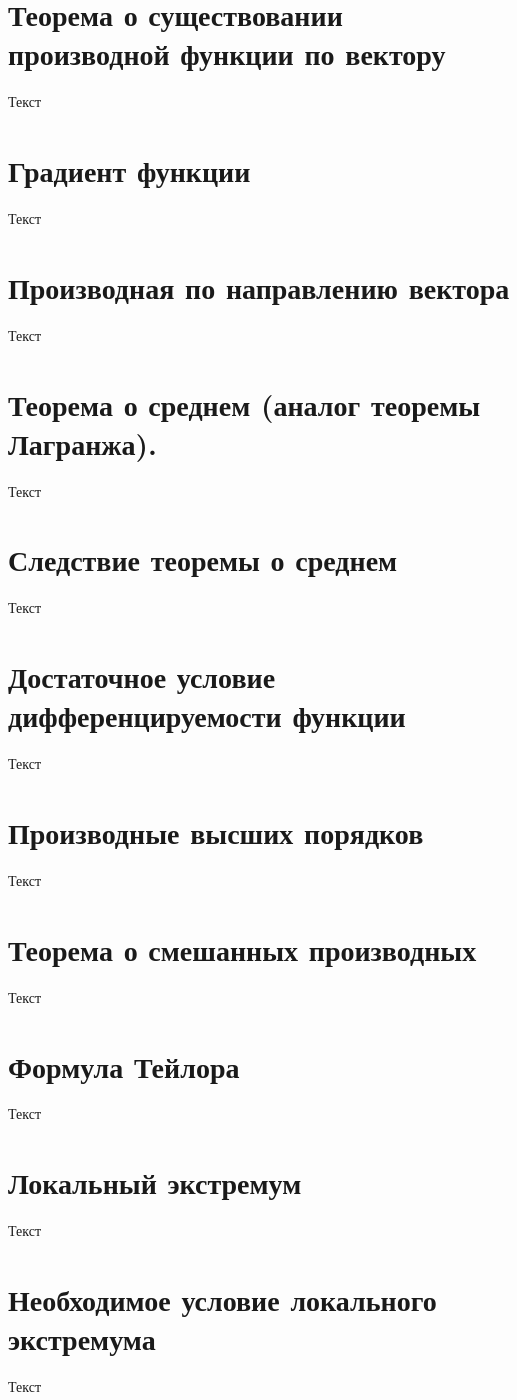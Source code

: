 \documentclass{report}
\theoremstyle{definition}
\begin{document}
\section{Теорема о существовании производной функции по вектору}
Текст

\section{Градиент функции}
Текст

\section{Производная по направлению вектора}
Текст

\section{Теорема о среднем (аналог теоремы Лагранжа).}
Текст

\section{Следствие теоремы о среднем}
Текст

\section{Достаточное условие дифференцируемости функции}
Текст

\section{Производные высших порядков}
Текст

\section{Теорема о смешанных производных}
Текст

\section{Формула Тейлора}
Текст

\section{Локальный экстремум}
Текст

\section{Необходимое условие локального экстремума}
Текст
\end{document}
